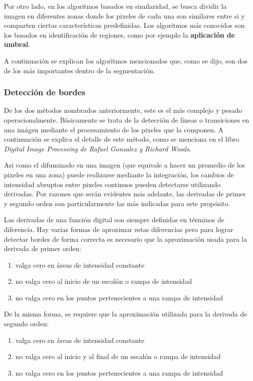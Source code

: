 Por otro lado, en los algoritmos basados en similaridad, se busca dividir la imagen en diferentes zonas donde los pixeles de cada una son similares entre si y comparten ciertas características predefinidas. Los algoritmos más conocidos son los basados en identificación de regiones, como por ejemplo la \textbf{aplicación de umbral}.

A continuación se explican los algoritmos mencionados que, como se dijo, son dos de los más importantes dentro de la segmentación.

\subsubsection{Detección de bordes}
\label{detecbordeSec}

De los dos métodos nombrados anteriormente, este es el más complejo y pesado operacionalmente. Básicamente se trata de la detección de líneas o transiciones en una imágen mediante el procesamiento de los pixeles que la componen. A continuación se explica el detalle de este método, como se menciona en el libro \textit{Digital Image Processing de Rafael Gonzalez y Richard Woods}\cite{Gonzalez}.

Asi como el difuminado en una imagen (que equivale a hacer un promedio de los pixeles en una zona) puede realizarse mediante la integración, los cambios de intensidad abruptos entre pixeles continuos pueden detectarse utilizando derivadas. Por razones que serán evidentes más adelante, las derivadas de primer y segundo orden son particularmente las más indicadas para este propósito.

Las derivadas de una función digital son siempre definidas en términos de diferencia. Hay varias formas de aproximar estas diferencias pero para lograr detectar bordes de forma correcta es necesario que la aproximación usada para la derivada de primer orden:

\begin{enumerate}
\item valga cero en áreas de intensidad constante
\item no valga cero al inicio de un escalón o rampa de intensidad
\item no valga cero en los puntos pertenecientes a una rampa de intensidad
\end{enumerate}

De la misma forma, se requiere que la aproximación utilizada para la derivada de segundo orden:

\begin{enumerate}
\item valga cero en áreas de intensidad constante
\item no valga cero al inicio y al final de un escalón o rampa de intensidad
\item no valga cero en los puntos pertenecientes a una rampa de intensidad
\end{enumerate}

